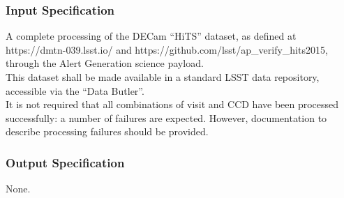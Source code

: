 \subsubsection{Input Specification}
A complete processing of the DECam ``HiTS'' dataset, as defined at
https://dmtn-039.lsst.io/ and
https://github.com/lsst/ap\_verify\_hits2015, through the Alert
Generation science payload.\\
This dataset shall be made available in a standard LSST data repository,
accessible via the ``Data Butler''.\\
It is not required that all combinations of visit and CCD have been
processed successfully: a number of failures are expected. However,
documentation to describe processing failures should be provided.


\subsubsection{Output Specification}
None.


